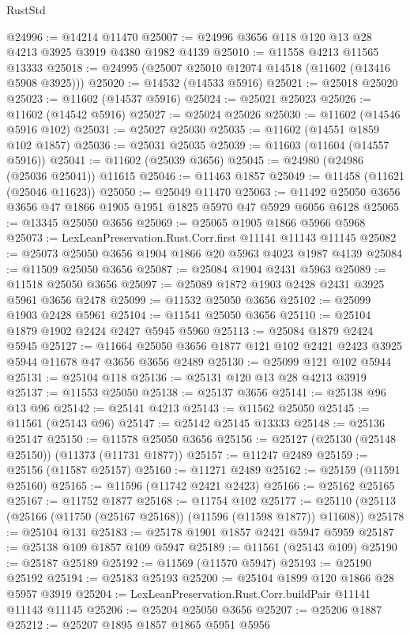 \begin{lexlean}{RustStd}
\begin{coremodule}
@24996 := @14214 @11470
@25007 := @24996 @3656 @118 @120 @13 @28 @4213 @3925 @3919 @4380 @1982 @4139
@25010 := @11558 @4213 @11565 @13333
@25018 := @24995 (@25007 @25010 @12074 @14518 (@11602 (@13416 @5908 @3925)))
@25020 := @14532 (@14533 @5916)
@25021 := @25018 @25020
@25023 := @11602 (@14537 @5916)
@25024 := @25021 @25023
@25026 := @11602 (@14542 @5916)
@25027 := @25024 @25026
@25030 := @11602 (@14546 @5916 @102)
@25031 := @25027 @25030
@25035 := @11602 (@14551 @1859 @102 @1857)
@25036 := @25031 @25035
@25039 := @11603 (@11604 (@14557 @5916))
@25041 := @11602 (@25039 @3656)
@25045 := @24980 (@24986 (@25036 @25041)) @11615
@25046 := @11463 @1857
@25049 := @11458 (@11621 (@25046 @11623))
@25050 := @25049 @11470
@25063 := @11492 @25050 @3656 @3656 @47 @1866 @1905 @1951 @1825 @5970 @47 @5929 @6056 @6128
@25065 := @13345 @25050 @3656
@25069 := @25065 @1905 @1866 @5966 @5968
@25073 := LexLeanPreservation.Rust.Corr.first @11141 @11143 @11145
@25082 := @25073 @25050 @3656 @1904 @1866 @20 @5963 @4023 @1987 @4139
@25084 := @11509 @25050 @3656
@25087 := @25084 @1904 @2431 @5963
@25089 := @11518 @25050 @3656
@25097 := @25089 @1872 @1903 @2428 @2431 @3925 @5961 @3656 @2478
@25099 := @11532 @25050 @3656
@25102 := @25099 @1903 @2428 @5961
@25104 := @11541 @25050 @3656
@25110 := @25104 @1879 @1902 @2424 @2427 @5945 @5960
@25113 := @25084 @1879 @2424 @5945
@25127 := @11664 @25050 @3656 @1877 @121 @102 @2421 @2423 @3925 @5944 @11678 @47 @3656 @3656 @2489
@25130 := @25099 @121 @102 @5944
@25131 := @25104 @118
@25136 := @25131 @120 @13 @28 @4213 @3919
@25137 := @11553 @25050
@25138 := @25137 @3656
@25141 := @25138 @96 @13 @96
@25142 := @25141 @4213
@25143 := @11562 @25050
@25145 := @11561 (@25143 @96)
@25147 := @25142 @25145 @13333
@25148 := @25136 @25147
@25150 := @11578 @25050 @3656
@25156 := @25127 (@25130 (@25148 @25150)) (@11373 (@11731 @1877))
@25157 := @11247 @2489
@25159 := @25156 (@11587 @25157)
@25160 := @11271 @2489
@25162 := @25159 (@11591 @25160)
@25165 := @11596 (@11742 @2421 @2423)
@25166 := @25162 @25165
@25167 := @11752 @1877
@25168 := @11754 @102
@25177 := @25110 (@25113 (@25166 (@11750 (@25167 @25168)) (@11596 (@11598 @1877)) @11608))
@25178 := @25104 @131
@25183 := @25178 @1901 @1857 @2421 @5947 @5959
@25187 := @25138 @109 @1857 @109 @5947
@25189 := @11561 (@25143 @109)
@25190 := @25187 @25189
@25192 := @11569 (@11570 @5947)
@25193 := @25190 @25192
@25194 := @25183 @25193
@25200 := @25104 @1899 @120 @1866 @28 @5957 @3919
@25204 := LexLeanPreservation.Rust.Corr.buildPair @11141 @11143 @11145
@25206 := @25204 @25050 @3656
@25207 := @25206 @1887
@25212 := @25207 @1895 @1857 @1865 @5951 @5956

\end{coremodule}
\end{lexlean}
